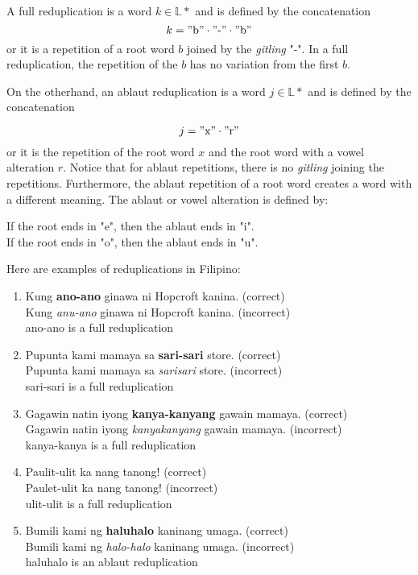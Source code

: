 A full reduplication is a word \(k \in \mathbb{L}*\) and is defined by the concatenation
\[
      k = "\text{b}" \cdot "\text{-}" \cdot "\text{b}"
\]
or it is a repetition of a root word \(b\) joined by the \textit{gitling} "-".
In a full reduplication, the repetition of the \(b\) has no variation from the first \(b\).

On the otherhand, an ablaut reduplication is a word \(j \in \mathbb{L}*\) and is defined by the
concatenation

\[
      j = "\text{x}" \cdot "\text{r}"
\]
or it is the repetition of the root word \(x\) and the root word with a vowel alteration \(r\). Notice
that for ablaut repetitions, there is no \textit{gitling} joining the repetitions. Furthermore,
the ablaut repetition of a root word creates a word with a different meaning. The ablaut or vowel
alteration is defined by:

\begin{center}
      If the root ends in "e", then the ablaut ends in "i". \\
      If the root ends in "o", then the ablaut ends in "u".
\end{center}

\begin{example}
      Here are examples of reduplications in Filipino:
\end{example}
\begin{enumerate}
      \item Kung \textbf{ano-ano} ginawa ni Hopcroft kanina. (correct) \\
            Kung \textit{anu-ano} ginawa ni Hopcroft kanina. (incorrect) \\
            ano-ano is a full reduplication
      \item Pupunta kami mamaya sa \textbf{sari-sari} store. (correct) \\
            Pupunta kami mamaya sa \textit{sarisari} store. (incorrect) \\
            sari-sari is a full reduplication
      \item Gagawin natin iyong \textbf{kanya-kanyang} gawain mamaya. (correct) \\
            Gagawin natin iyong \textit{kanyakanyang} gawain mamaya. (incorrect) \\
            kanya-kanya is a full reduplication
      \item Paulit-ulit ka nang tanong! (correct) \\
            Paulet-ulit ka nang tanong! (incorrect) \\
            ulit-ulit is a full reduplication
      \item Bumili kami ng \textbf{haluhalo} kaninang umaga. (correct) \\
            Bumili kami ng \textit{halo-halo} kaninang umaga. (incorrect) \\
            haluhalo is an ablaut reduplication
\end{enumerate}

